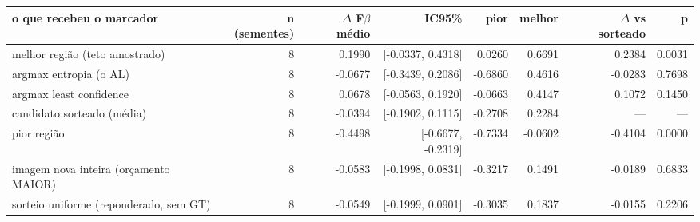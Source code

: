\begin{tabular}{lrrrrrrr}
\hline
o que recebeu o marcador & n (sementes) & $\Delta$ F$\beta$ médio & IC95\% & pior & melhor & $\Delta$ vs sorteado & p \\
\hline
melhor região (teto amostrado) & 8 & 0.1990 & [-0.0337, 0.4318] & 0.0260 & 0.6691 & 0.2384 & 0.0031 \\
argmax entropia (o AL) & 8 & -0.0677 & [-0.3439, 0.2086] & -0.6860 & 0.4616 & -0.0283 & 0.7698 \\
argmax least confidence & 8 & 0.0678 & [-0.0563, 0.1920] & -0.0663 & 0.4147 & 0.1072 & 0.1450 \\
candidato sorteado (média) & 8 & -0.0394 & [-0.1902, 0.1115] & -0.2708 & 0.2284 & --- & --- \\
pior região & 8 & -0.4498 & [-0.6677, -0.2319] & -0.7334 & -0.0602 & -0.4104 & 0.0000 \\
imagem nova inteira (orçamento MAIOR) & 8 & -0.0583 & [-0.1998, 0.0831] & -0.3217 & 0.1491 & -0.0189 & 0.6833 \\
sorteio uniforme (reponderado, sem GT) & 8 & -0.0549 & [-0.1999, 0.0901] & -0.3035 & 0.1837 & -0.0155 & 0.2206 \\
\hline
\end{tabular}
